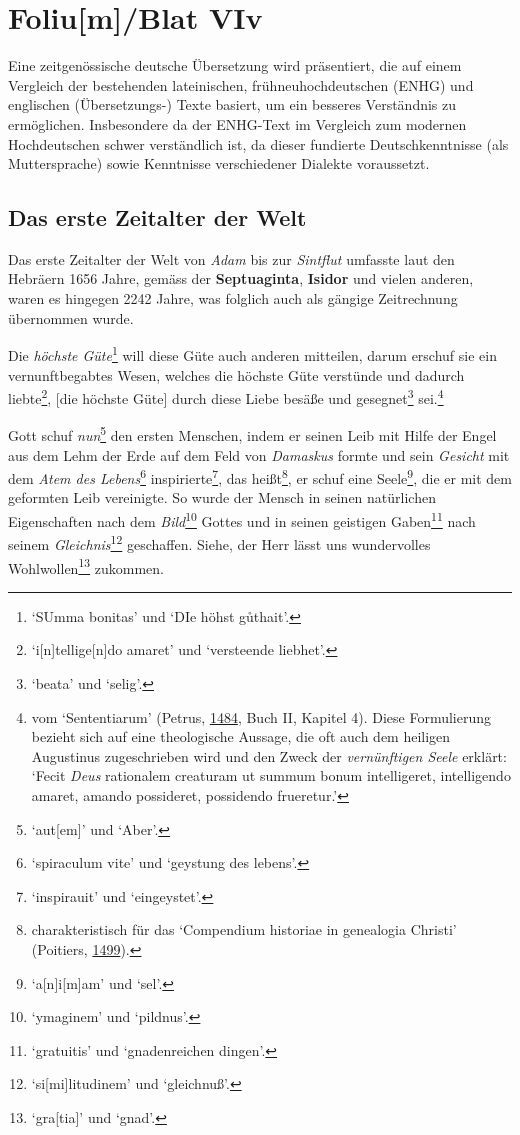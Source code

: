 \documentclass[
]{article}
\author{Dietmar Gerald Schrausser}
\date{09.05.2026}
\begin{document}
\hypertarget{foliumblat-viv}{%
\section{Foliu{[}m{]}/Blat VIv}\label{foliumblat-viv}}

Eine zeitgenössische deutsche Übersetzung wird präsentiert, die auf
einem Vergleich der bestehenden lateinischen, frühneuhochdeutschen
(ENHG) und englischen (Übersetzungs-) Texte basiert, um ein besseres
Verständnis zu ermöglichen. Insbesondere da der ENHG-Text im Vergleich
zum modernen Hochdeutschen schwer verständlich ist, da dieser fundierte
Deutschkenntnisse (als Muttersprache) sowie Kenntnisse verschiedener
Dialekte voraussetzt.

\hypertarget{das-erste-zeitalter-der-welt}{%
\subsection{Das erste Zeitalter der
Welt}\label{das-erste-zeitalter-der-welt}}

Das erste Zeitalter der Welt von \emph{Adam} bis zur \emph{Sintflut}
umfasste laut den Hebräern 1656 Jahre, gemäss der \textbf{Septuaginta},
\textbf{Isidor} und vielen anderen, waren es hingegen 2242 Jahre, was
folglich auch als gängige Zeitrechnung übernommen wurde.

Die \emph{höchste Güte}\footnote{`SUmma bonitas' und `DIe höhst
  gůthait'.} will diese Güte auch anderen mitteilen, darum erschuf sie
ein vernunftbegabtes Wesen, welches die höchste Güte verstünde und
dadurch liebte\footnote{`i{[}n{]}tellige{[}n{]}do amaret' und
  `versteende liebhet'.}, {[}die höchste Güte{]} durch diese Liebe
besäße und gesegnet\footnote{`beata' und `selig'.} sei.\footnote{vom
  `Sententiarum' (Petrus,
  \href{https://doi.org/10.3931/e-rara-18241}{1484}, Buch II, Kapitel
  4). Diese Formulierung bezieht sich auf eine theologische Aussage, die
  oft auch dem heiligen Augustinus zugeschrieben wird und den Zweck der
  \emph{vernünftigen Seele} erklärt: `Fecit \emph{Deus} rationalem
  creaturam ut summum bonum intelligeret, intelligendo amaret, amando
  possideret, possidendo frueretur.'}

Gott schuf \emph{nun}\footnote{`aut{[}em{]}' und `Aber'.} den ersten
Menschen, indem er seinen Leib mit Hilfe der Engel aus dem Lehm der Erde
auf dem Feld von \emph{Damaskus} formte und sein \emph{Gesicht} mit dem
\emph{Atem des Lebens}\footnote{`spiraculum vite' und `geystung des
  lebens'.} inspirierte\footnote{`inspirauit' und `eingeystet'.}, das
heißt\footnote{charakteristisch für das `Compendium historiae in
  genealogia Christi' (Poitiers,
  \href{https://libwww.freelibrary.org/digital/item/22446}{1499}).}, er
schuf eine Seele\footnote{`a{[}n{]}i{[}m{]}am' und `sel'.}, die er mit
dem geformten Leib vereinigte. So wurde der Mensch in seinen natürlichen
Eigenschaften nach dem \emph{Bild}\footnote{`ymaginem' und `pildnus'.}
Gottes und in seinen geistigen Gaben\footnote{`gratuitis' und
  `gnadenreichen dingen'.} nach seinem \emph{Gleichnis}\footnote{`si{[}mi{]}litudinem'
  und `gleichnuß'.} geschaffen. Siehe, der Herr lässt uns wundervolles
Wohlwollen\footnote{`gra{[}tia{]}' und `gnad'.} zukommen.
\end{document}
